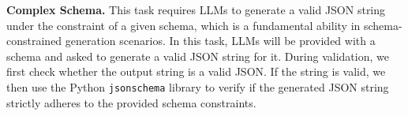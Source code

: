 \textbf{Complex Schema.} This task requires LLMs to generate a valid JSON string under the constraint of a given schema, which is a fundamental ability in schema-constrained generation scenarios. In this task, LLMs will be provided with a schema and asked to generate a valid JSON string for it. During validation, we first check whether the output string is a valid JSON. If the string is valid, we then use the Python \texttt{jsonschema} library to verify if the generated JSON string strictly adheres to the provided schema constraints.

